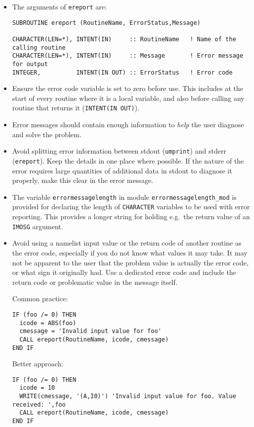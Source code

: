 \begin{itemize}
\item The arguments of \verb|ereport| are:
\begin{verbatim}
SUBROUTINE ereport (RoutineName, ErrorStatus,Message)

CHARACTER(LEN=*), INTENT(IN)     :: RoutineName   ! Name of the calling routine
CHARACTER(LEN=*), INTENT(IN)     :: Message       ! Error message for output
INTEGER,          INTENT(IN OUT) :: ErrorStatus   ! Error code
\end{verbatim}
\item Ensure the error code variable is set to zero before use. This includes
at the start of every routine where it is a local variable, and also before
calling any routine that returns it (\verb|INTENT(IN OUT)|).
\item Error messages should contain enough information to \emph{help} the user
diagnose and solve the problem.
\item Avoid splitting error information between stdout (\verb|umprint|) and
stderr (\verb|ereport|). Keep the details in one place where possible. If the
nature of the error requires large quantities of additional data in stdout to
diagnose it properly, make this clear in the error message.
\item The variable \verb|errormessagelength| in module
\verb|errormessagelength_mod| is provided for declaring the length of
\verb|CHARACTER| variables to be used with error reporting. This provides a
longer string for holding e.g.\ the return value of an \verb|IMOSG| argument.
\item Avoid using a namelist input value or the return code of another routine
as the error code, especially if you do not know what values it may take. It
may not be apparent to the user that the problem value is actually the error
code, or what sign it originally had. Use a dedicated error code and include
the return code or problematic value in the message itself.

Common practice:
\begin{verbatim}
IF (foo /= 0) THEN
  icode = ABS(foo)
  cmessage = 'Invalid input value for foo'
  CALL ereport(RoutineName, icode, cmessage)
END IF
\end{verbatim}
Better approach:
\begin{verbatim}
IF (foo /= 0) THEN
  icode = 10
  WRITE(cmessage, '(A,I0)') 'Invalid input value for foo. Value received: ',foo
  CALL ereport(RoutineName, icode, cmessage)
END IF
\end{verbatim}
\end{itemize}
